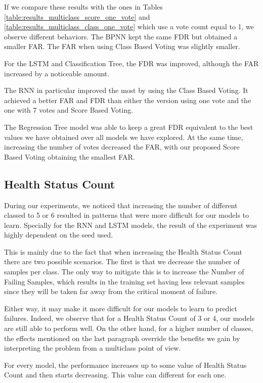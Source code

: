 If we compare these results with the ones in Tables \ref{table:results_multiclass_score_one_vote} and \ref{table:results_multiclass_class_one_vote} which use a vote count equal to 1, we observe different behaviors.
The BPNN kept the same FDR but obtained a smaller FAR.
The FAR when using Class Based Voting was slightly smaller.

For the LSTM and Classification Tree, the FDR was improved, although the FAR increased by a noticeable amount.

The RNN in particular improved the most by using the Class Based Voting.
It achieved a better FAR and FDR than either the version using one vote and the one with 7 votes and Score Based Voting.

The Regression Tree model was able to keep a great FDR equivalent to the best values we have obtained over all models we have explored.
At the same time, increasing the number of votes decreased the FAR, with our proposed Score Based Voting obtaining the smallest FAR.

\subsection{Health Status Count}

During our experiments, we noticed that increasing the number of different classed to 5 or 6 resulted in patterns that were more difficult for our models to learn.
Specially for the RNN and LSTM models, the result of the experiment was highly dependent on the seed used.

This is mainly due to the fact that when increasing the Health Status Count there are two possible scenarios.
The first is that we decrease the number of samples per class.
The only way to mitigate this is to increase the Number of Failing Samples, which results in the training set having less relevant samples since they will be taken far away from the critical moment of failure.

Either way, it may make it more difficult for our models to learn to predict failures.
Indeed, we observe that for a Health Status Count of 3 or 4, our models are still able to perform well.
On the other hand,  for a higher number of classes, the effects mentioned on the last paragraph override the benefits we gain by interpreting the problem from a multiclass point of view.

For every model, the performance increases up to some value of Health Status Count and then starts decreasing.
This value can different for each one.

